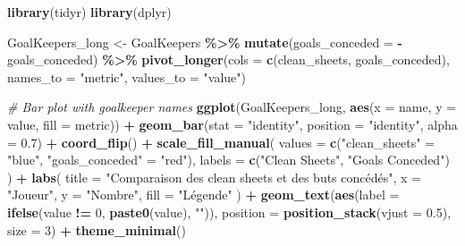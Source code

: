 \documentclass[
  6pt,
]{article}
\newenvironment{Shaded}{\begin{snugshade}}{\end{snugshade}}
\newcommand{\AttributeTok}[1]{\textcolor[rgb]{0.13,0.29,0.53}{#1}}
\newcommand{\CommentTok}[1]{\textcolor[rgb]{0.56,0.35,0.01}{\textit{#1}}}
\newcommand{\DecValTok}[1]{\textcolor[rgb]{0.00,0.00,0.81}{#1}}
\newcommand{\FloatTok}[1]{\textcolor[rgb]{0.00,0.00,0.81}{#1}}
\newcommand{\FunctionTok}[1]{\textcolor[rgb]{0.13,0.29,0.53}{\textbf{#1}}}
\newcommand{\NormalTok}[1]{#1}
\newcommand{\OtherTok}[1]{\textcolor[rgb]{0.56,0.35,0.01}{#1}}
\newcommand{\SpecialCharTok}[1]{\textcolor[rgb]{0.81,0.36,0.00}{\textbf{#1}}}
\newcommand{\StringTok}[1]{\textcolor[rgb]{0.31,0.60,0.02}{#1}}
\begin{document}
\begin{Shaded}
\begin{Highlighting}[]
\FunctionTok{library}\NormalTok{(tidyr)}
\FunctionTok{library}\NormalTok{(dplyr)}

\NormalTok{GoalKeepers\_long }\OtherTok{\textless{}{-}}\NormalTok{ GoalKeepers }\SpecialCharTok{\%\textgreater{}\%}
  \FunctionTok{mutate}\NormalTok{(}\AttributeTok{goals\_conceded =} \SpecialCharTok{{-}}\NormalTok{goals\_conceded) }\SpecialCharTok{\%\textgreater{}\%} 
  \FunctionTok{pivot\_longer}\NormalTok{(}\AttributeTok{cols =} \FunctionTok{c}\NormalTok{(clean\_sheets, goals\_conceded), }
               \AttributeTok{names\_to =} \StringTok{"metric"}\NormalTok{, }
               \AttributeTok{values\_to =} \StringTok{"value"}\NormalTok{)}

\CommentTok{\# Bar plot with goalkeeper names}
\FunctionTok{ggplot}\NormalTok{(GoalKeepers\_long, }\FunctionTok{aes}\NormalTok{(}\AttributeTok{x =}\NormalTok{ name, }\AttributeTok{y =}\NormalTok{ value, }\AttributeTok{fill =}\NormalTok{ metric)) }\SpecialCharTok{+}
  \FunctionTok{geom\_bar}\NormalTok{(}\AttributeTok{stat =} \StringTok{"identity"}\NormalTok{, }\AttributeTok{position =} \StringTok{"identity"}\NormalTok{, }\AttributeTok{alpha =} \FloatTok{0.7}\NormalTok{) }\SpecialCharTok{+}
  \FunctionTok{coord\_flip}\NormalTok{() }\SpecialCharTok{+}
  \FunctionTok{scale\_fill\_manual}\NormalTok{(}
    \AttributeTok{values =} \FunctionTok{c}\NormalTok{(}\StringTok{"clean\_sheets"} \OtherTok{=} \StringTok{"blue"}\NormalTok{, }\StringTok{"goals\_conceded"} \OtherTok{=} \StringTok{"red"}\NormalTok{),}
    \AttributeTok{labels =} \FunctionTok{c}\NormalTok{(}\StringTok{"Clean Sheets"}\NormalTok{, }\StringTok{"Goals Conceded"}\NormalTok{)}
\NormalTok{  ) }\SpecialCharTok{+}
  \FunctionTok{labs}\NormalTok{(}
    \AttributeTok{title =} \StringTok{"Comparaison des clean sheets et des buts concédés"}\NormalTok{,}
    \AttributeTok{x =} \StringTok{"Joueur"}\NormalTok{,}
    \AttributeTok{y =} \StringTok{"Nombre"}\NormalTok{,}
    \AttributeTok{fill =} \StringTok{"Légende"}
\NormalTok{  ) }\SpecialCharTok{+}
  \FunctionTok{geom\_text}\NormalTok{(}\FunctionTok{aes}\NormalTok{(}\AttributeTok{label =} \FunctionTok{ifelse}\NormalTok{(value }\SpecialCharTok{!=} \DecValTok{0}\NormalTok{, }\FunctionTok{paste0}\NormalTok{(value), }\StringTok{""}\NormalTok{)), }
            \AttributeTok{position =} \FunctionTok{position\_stack}\NormalTok{(}\AttributeTok{vjust =} \FloatTok{0.5}\NormalTok{), }\AttributeTok{size =} \DecValTok{3}\NormalTok{) }\SpecialCharTok{+}
  \FunctionTok{theme\_minimal}\NormalTok{()}
\end{Highlighting}
\end{Shaded}
\end{document}
